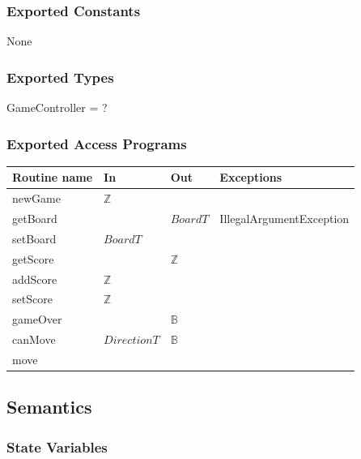 \documentclass[12pt]{article}
\begin{document}
\subsubsection* {Exported Constants}

None

\subsubsection* {Exported Types}

GameController = ?

\subsubsection* {Exported Access Programs}

\begin{tabular}{| l | l | l | p{5cm} |}
  \hline
  \textbf{Routine name} & \textbf{In}  & \textbf{Out} & \textbf{Exceptions}        \\
  \hline
  newGame               & $\mathbb{Z}$ &              &                            \\
  \hline
  getBoard              &              & $BoardT$     & IllegalArgumentException \\
  \hline
  setBoard              & $BoardT$     &              &                            \\
  \hline
  getScore              &              & $\mathbb{Z}$ &                            \\
  \hline
  addScore              & $\mathbb{Z}$ &              &                            \\
  \hline
  setScore              & $\mathbb{Z}$ &              &                            \\
  \hline
  gameOver              &              & $\mathbb{B}$ &                            \\
  \hline
  canMove               & $DirectionT$ & $\mathbb{B}$ &                            \\
  \hline
  move                  &              &              &                            \\
  \hline
\end{tabular}

\subsection* {Semantics}

\subsubsection* {State Variables}
\end{document}
